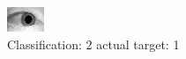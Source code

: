 \begin{figure}[h!]
\begin{center}
\includegraphics[width=0.60\columnwidth]{figures/ID1430_class_2_target_1.png}
\end{center}
\caption{ Classification: 2 actual target: 1}
\label{fig:ID1430_class_2_target_1}
\end{figure}
